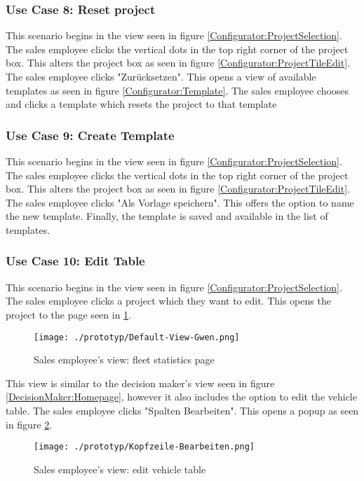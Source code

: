 \subsubsection{Use Case 8: Reset project}
This scenario begins in the view seen in figure \ref{Configurator:ProjectSelection}. The sales employee clicks the vertical dots in the top right corner of the project box. This alters the project box as seen in figure \ref{Configurator:ProjectTileEdit}. The sales employee clicks "Zurücksetzen". This opens a view of available templates as seen in figure \ref{Configurator:Template}. The sales employee chooses and clicks a template which resets the project to that template


\subsubsection{Use Case 9: Create Template}
This scenario begins in the view seen in figure \ref{Configurator:ProjectSelection}. The sales employee clicks the vertical dots in the top right corner of the project box. This alters the project box as seen in figure \ref{Configurator:ProjectTileEdit}. The sales employee clicks "Als Vorlage speichern". This offers the option to name the new template. Finally, the template is saved and available in the list of templates.


\subsubsection{Use Case 10: Edit Table}
This scenario begins in the view seen in figure \ref{Configurator:ProjectSelection}. The sales employee clicks a project which they want to edit. This opens the project to the page seen in \ref{Sales:VehicleList}. 

\begin{figure}[H]
  \centering
  \texttt{[image: ./prototyp/Default-View-Gwen.png]}
  \caption{Sales employee's view: fleet statistics page}
  \label{Sales:VehicleList}
\end{figure}

This view is similar to the decision maker's view seen in figure \ref{DecisionMaker:Homepage}, however it also includes the option to edit the vehicle table. The sales employee clicks "Spalten Bearbeiten". This opens a popup as seen in figure \ref{Sales:EditTable}.

\begin{figure}[ht]
  \centering
  \texttt{[image: ./prototyp/Kopfzeile-Bearbeiten.png]}
  \caption{Sales employee's view: edit vehicle table}
  \label{Sales:EditTable}
\end{figure}

